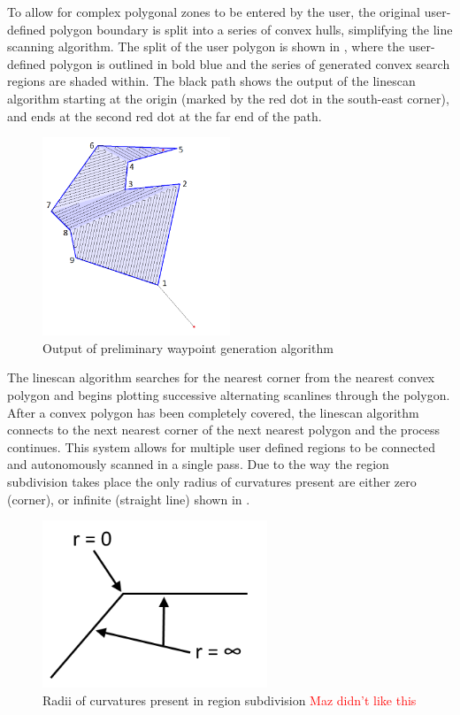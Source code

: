 \documentclass[main.tex]{subfiles}
\begin{document}
To allow for complex polygonal zones to be entered by the user, the original user-defined polygon boundary is split into a series of convex hulls, simplifying the line scanning algorithm. The split of the user polygon is shown in , where the user-defined polygon is outlined in bold blue and the series of generated convex search regions are shaded within. The black path shows the output of the linescan algorithm starting at the origin (marked by the red dot in the south-east corner), and ends at the second red dot at the far end of the path. 
\begin{figure}[ht]
\includegraphics[width=0.5\textwidth]{4-DetailedDesign/lineScanAlgorithm2.png}
\centering
\caption{Output of preliminary waypoint generation algorithm} 
\end{figure}
The linescan algorithm searches for the nearest corner from the nearest convex polygon and begins plotting successive alternating scanlines through the polygon. After a convex polygon has been completely covered, the linescan algorithm connects to the next nearest corner of the next nearest polygon and the process continues. This system allows for multiple user defined regions to be connected and autonomously scanned in a single pass. Due to the way the region subdivision takes place the only radius of curvatures present are either zero (corner), or infinite (straight line) shown in .
\begin{figure}[ht]
\includegraphics[width=0.6\textwidth]{4-DetailedDesign/radiusOfCurvatures.png}
\centering
\caption{Radii of curvatures present in region subdivision \textcolor{red}{Maz didn't like this}} 
\end{figure}
\end{document}

